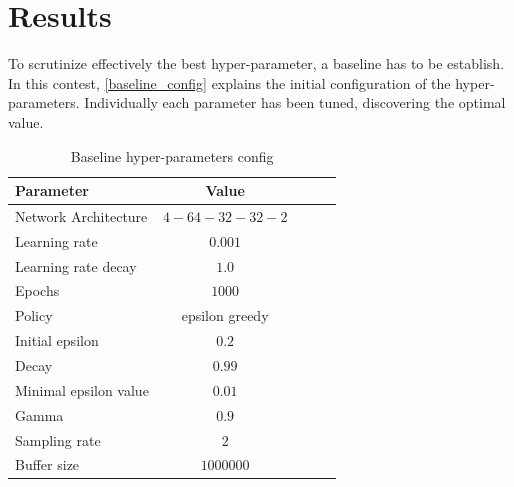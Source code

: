 \documentclass{article}
\begin{document}
\section{Results}
\label{sec:results}
To scrutinize effectively the best hyper-parameter, a baseline has to be establish. In this contest, \autoref{baseline_config} explains the initial configuration of the hyper-parameters. Individually each parameter has been tuned, discovering the optimal value.  
  

\begin{table}[t]
   \caption{Baseline hyper-parameters config}
   \label{baseline_config}
   \vskip 0.15in
   \begin{center}
   \begin{small}
   \begin{sc}
   \begin{tabular}{lcccr}
   \toprule
   Parameter & Value \\
   \midrule
   Network Architecture    & $4-64-32-32-2$ \\
   Learning rate           & $0.001$ \\
   Learning rate decay     & $1.0$   \\
   Epochs                  & $1000$ \\
   Policy                  & epsilon greedy \\
   Initial epsilon         & $0.2$ \\
   Decay                   & $0.99$ \\
   Minimal epsilon value   & $0.01$ \\
   Gamma                   & $0.9$ \\
   Sampling rate           & $2$ \\
   Buffer size             & $1000000$ \\

   \bottomrule
   \end{tabular}
   \end{sc}
   \end{small}
   \end{center}
   \vskip -0.1in
   \end{table}
\end{document}
